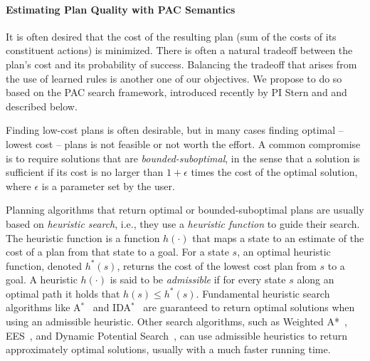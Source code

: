 \documentclass[12pt]{article}
\begin{document}
\paragraph{Estimating Plan Quality with PAC Semantics}



 

It is often desired that the cost of the resulting plan (sum of the costs of its constituent actions) is minimized. 
There is often a natural tradeoff between the plan's cost  and its probability of success. 
Balancing the tradeoff that arises from the use of learned rules is another one of our objectives. We propose to do so based on the PAC search framework, introduced recently by PI Stern and and described below. 


Finding low-cost plans is often desirable, but  in many cases finding optimal -- lowest cost -- plans is not feasible or not worth the effort. A common compromise is to require solutions that are {\em bounded-suboptimal}, in the sense that a solution is sufficient if its cost is no larger than $1+\epsilon$ times the cost of the optimal solution, where $\epsilon$ is a parameter set by the user. 


Planning algorithms that return optimal or bounded-suboptimal plans are usually based on {\em heuristic search}, i.e., they use a {\em heuristic function} to guide their search. The heuristic function is a function $h(\cdot)$ that maps a state to an estimate of the cost of a plan from that state to a goal. For a state $s$, an optimal heuristic function, denoted $h^*(s)$, returns the cost of the lowest cost plan from $s$ to a goal. A heuristic $h(\cdot)$  is said to be {\em admissible} if for every state $s$ along an optimal path it holds that $h(s)\leq h^*(s)$. Fundamental heuristic search algorithms like A$^*$~\cite{hart1968formal} and IDA$^*$~\cite{korf1985depth} are guaranteed to return optimal solutions when using an admissible heuristic. Other search algorithms, such as Weighted A*~\cite{pohl1973avoidance}, EES~\cite{thayer2011bounded}, and Dynamic Potential Search~\cite{gilon2016dynamic}, can use admissible heuristics to return approximately optimal solutions, usually with a much faster running time. 
\end{document}
